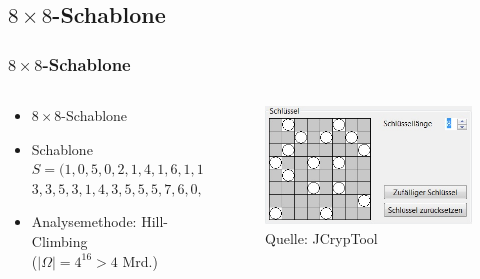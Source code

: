 \documentclass{beamer}
\begin{document}
\subsection{\texorpdfstring{$8 \times 8$-Schablone}{8 × 8-Schablone}} 
\begin{frame}
\frametitle{$8 \times 8$-Schablone}
\begin{columns}
\begin{column}{5cm}
\vspace{1cm}
\begin{itemize}
\item $8 \times 8$-Schablone
\item Schablone $S=(1,0,5,0,2,1,4,1,6,1,1,2,7,2,0,3,$\\$3,3,5,3,1,4,3,5,5,5,7,6,0,7,4,7)$
\item Analysemethode: Hill-Climbing \\($|\Omega|=4^{16}> 4$ Mrd.)
\end{itemize}
\vspace{3cm} 
\end{column}
\hspace{1cm}
\begin{column}{5cm}
\begin{figure}
\includegraphics[scale=0.6]{Schablone8mal8.jpg}
\caption{Quelle: JCrypTool}
\end{figure}
\vspace{1cm}
\end{column}
\end{columns}
\end{frame}
\end{document}
